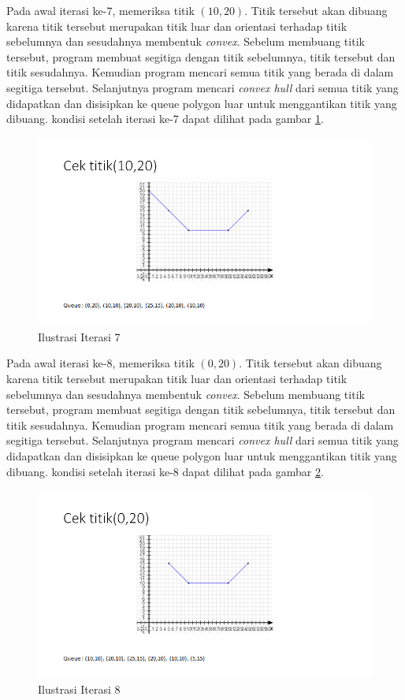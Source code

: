 \par Pada awal iterasi ke-7, memeriksa titik $(10,20)$. Titik tersebut akan dibuang karena titik tersebut merupakan titik luar dan orientasi terhadap titik sebelumnya dan sesudahnya membentuk \textit{convex}. Sebelum membuang titik tersebut, program membuat segitiga dengan titik sebelumnya, titik tersebut dan titik sesudahnya. Kemudian program mencari semua titik yang berada di dalam segitiga tersebut. Selanjutnya program mencari \textit{convex hull} dari semua titik yang didapatkan dan disisipkan ke queue polygon luar untuk menggantikan titik yang dibuang. kondisi setelah iterasi ke-7 dapat dilihat pada gambar \ref{fig:iterasi-7}.
\begin{figure}[!h]
	\Centering
	\includegraphics [width=\columnwidth]{bab5/img/iterasi-7}
	\caption {Ilustrasi Iterasi 7}
	\label {fig:iterasi-7}
\end{figure}

\par Pada awal iterasi ke-8, memeriksa titik $(0,20)$. Titik tersebut akan dibuang karena titik tersebut merupakan titik luar dan orientasi terhadap titik sebelumnya dan sesudahnya membentuk \textit{convex}. Sebelum membuang titik tersebut, program membuat segitiga dengan titik sebelumnya, titik tersebut dan titik sesudahnya. Kemudian program mencari semua titik yang berada di dalam segitiga tersebut. Selanjutnya program mencari \textit{convex hull} dari semua titik yang didapatkan dan disisipkan ke queue polygon luar untuk menggantikan titik yang dibuang. kondisi setelah iterasi ke-8 dapat dilihat pada gambar \ref{fig:iterasi-8}.
\begin{figure}[!h]
	\Centering
	\includegraphics [width=\columnwidth]{bab5/img/iterasi-8}
	\caption {Ilustrasi Iterasi 8}
	\label {fig:iterasi-8}
\end{figure}


